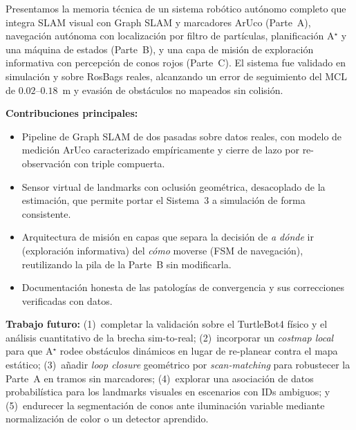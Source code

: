 Presentamos la memoria técnica de un sistema robótico autónomo completo que integra SLAM visual con Graph SLAM y marcadores ArUco (Parte~A), navegación autónoma con localización por filtro de partículas, planificación A$^\star$ y una máquina de estados (Parte~B), y una capa de misión de exploración informativa con percepción de conos rojos (Parte~C). El sistema fue validado en simulación y sobre RosBags reales, alcanzando un error de seguimiento del MCL de $0.02$--$0.18$~m y evasión de obstáculos no mapeados sin colisión.

\textbf{Contribuciones principales:}
\begin{itemize}
\item Pipeline de Graph SLAM de dos pasadas sobre datos reales, con modelo de medición ArUco caracterizado empíricamente y cierre de lazo por re-observación con triple compuerta.
\item Sensor virtual de landmarks con oclusión geométrica, desacoplado de la estimación, que permite portar el Sistema~3 a simulación de forma consistente.
\item Arquitectura de misión en capas que separa la decisión de \emph{a dónde} ir (exploración informativa) del \emph{cómo} moverse (FSM de navegación), reutilizando la pila de la Parte~B sin modificarla.
\item Documentación honesta de las patologías de convergencia y sus correcciones verificadas con datos.
\end{itemize}

\textbf{Trabajo futuro:} (1)~completar la validación sobre el TurtleBot4 físico y el análisis cuantitativo de la brecha sim-to-real; (2)~incorporar un \emph{costmap local} para que A$^\star$ rodee obstáculos dinámicos en lugar de re-planear contra el mapa estático; (3)~añadir \emph{loop closure} geométrico por \emph{scan-matching} para robustecer la Parte~A en tramos sin marcadores; (4)~explorar una asociación de datos probabilística para los landmarks visuales en escenarios con IDs ambiguos; y (5)~endurecer la segmentación de conos ante iluminación variable mediante normalización de color o un detector aprendido.
